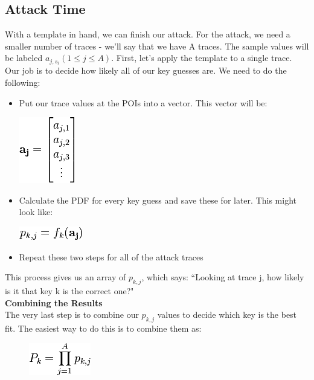     \subsection{Attack Time}
    With a template in hand, we can finish our attack. For the attack, we need a
    smaller number of traces - we'll say that we have A traces. The sample
    values will be labeled $a_{j, s_i} (1 \le j \le A)$. First, let's apply the
    template to a single trace. Our job is to decide how likely all of our key
    guesses are. We need to do the following:
    \begin{itemize}
      \item Put our trace values at the POIs into a vector. This vector will be:
      
       \begin{minipage}{\linewidth}
      \centering
      \includegraphics[scale=0.7]{images/Lecture_5/pic6.png}
      \end{minipage}
       
      \item Calculate the PDF for every key guess and save these for later. This
      might look like:
      \begin{minipage}{0cm}
      \centering
      \includegraphics[scale=0.7]{images/Lecture_5/pic7.png}
      \end{minipage}
      \item Repeat these two steps for all of the attack traces
    \end{itemize}
    This process gives us an array of $p_{k, j}$, which says: ``Looking at trace
    j, how likely is it that key k is the correct one?"\\
    \textbf{Combining the Results}\\
    The very last step is to combine our $p_{k, j}$ values to decide which key
    is the best fit. The easiest way to do this is to combine them as:
    
    \begin{figure}[htp]
        \centering
        \includegraphics[scale=0.7]{images/Lecture_5/pic8.png}
       \end{figure}
    
